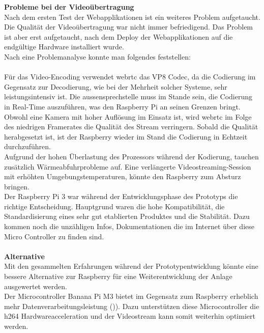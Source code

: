\textbf{Probleme bei der Videoübertragung}
\\
Nach dem ersten Test der Webapplikationen ist ein weiteres Problem aufgetaucht. Die Qualität der Videoübertragung war nicht immer befriedigend. Das Problem ist aber erst aufgetaucht, nach dem Deploy der Webapplikationen auf die endgültige Hardware installiert wurde.
\\
Nach eine Problemanalyse konnte man folgendes feststellen:
\\
\\
Für das Video-Encoding verwendet \gls{webrtc} das VP8 Codec, da die Codierung im Gegensatz zur Decodierung, wie bei der Mehrheit solcher Systeme, sehr leistungsintensiv ist. Die \gls{aussensprechstelle} muss im Stande sein, die Codierung in Real-Time auszuführen, was den Raspberry Pi an seinen Grenzen bringt. Obwohl eine Kamera mit hoher Auflösung im Einsatz ist, wird \gls{webrtc} im Folge des niedrigen Framerates die Qualität des Stream verringern. Sobald die Qualität herabgesetzt ist, ist der Raspberry wieder im Stand die Codierung in Echtzeit durchzuführen. 
\\
Aufgrund der hohen Überlastung des Prozessors während der Kodierung, tauchen zusätzlich Wärmeabfuhrprobleme auf. Eine verlängerte Videostreaming-Session mit erhöhten Umgebungstemperaturen, könnte den Raspberry zum Absturz bringen.
\\
Der Raspberry Pi 3 war während der Entwicklungsphase des Prototyps die richtige Entscheidung. Hauptgrund waren die hohe Kompatibilität, die Standardisierung eines sehr gut etablierten Produktes und die Stabilität. Dazu kommen noch die unzähligen Infos, Dokumentationen die im Internet über diese Micro Controller zu finden sind.
\\
\\
\textbf{Alternative}
\\ 
Mit den gesammelten Erfahrungen während der Prototypentwicklung könnte eine bessere Alternative zur Raspberry für eine Weiterentwicklung der Anlage ausgewertet werden.
\\
Der Microcontroller Banana Pi M3 bietet im Gegensatz zum Raspberry erheblich mehr Datenverarbeitungsleistung ()). Dazu unterstützen diese Microcontroller die \gls{h264} Hardwareacceleration und der Videostream kann somit weiterhin optimiert werden.


